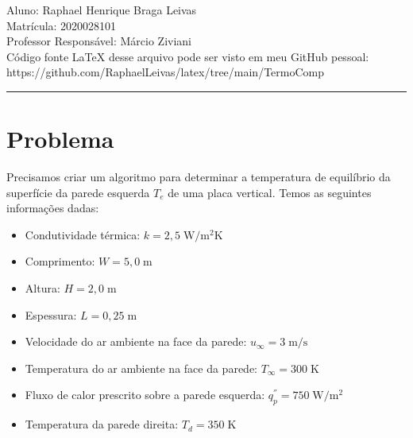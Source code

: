 \documentclass[12pt]{scrartcl}
\newcommand{\un}[1]{\;\textrm{#1}}
\begin{document}



\pagestyle{fancy}

\fancyhead{}
\fancyfoot{}

\begin{center}
    Aluno: Raphael Henrique Braga Leivas \\
    Matrícula: 2020028101 \\
    Professor Responsável: Márcio Ziviani \\[20pt]

    Código fonte LaTeX desse arquivo pode ser visto em meu GitHub pessoal: https://github.com/RaphaelLeivas/latex/tree/main/TermoComp
\end{center}

\hrule

\section{Problema}

Precisamos criar um algoritmo para determinar a temperatura de equilíbrio da superfície
da parede esquerda $T_e$ de uma placa vertical. Temos as seguintes informações dadas:

\begin{itemize}
    \item Condutividade térmica: $k=2,5 \un{W/m$^2$K}$
    \item Comprimento: $W=5,0 \un{m}$
    \item Altura: $H=2,0 \un{m}$
    \item Espessura: $L=0,25 \un{m}$
    \item Velocidade do ar ambiente na face da parede: $u_{\infty}=3 \un{m/s}$
    \item Temperatura do ar ambiente na face da parede: $T_{\infty}=300 \un{K}$
    \item Fluxo de calor prescrito sobre a parede esquerda: $q_{p}^{''}=750 \un{W/m$^2$}$
    \item Temperatura da parede direita: $T_d=350 \un{K}$
\end{itemize}
\end{document}
